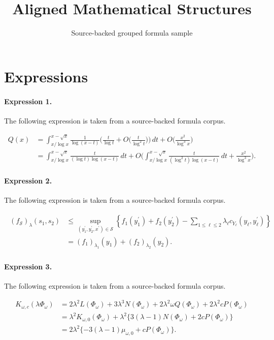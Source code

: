\documentclass[11pt]{article}
\title{Aligned Mathematical Structures}
\author{Source-backed grouped formula sample}
\date{}
\begin{document}
\maketitle
\section{Expressions}
\paragraph{Expression 1.} The following expression is taken from a source-backed formula corpus.

\begin{align*} Q(x) &= \int_{x/\log x}^{x-\sqrt x} \frac1{\log(x-t)}\bigg( \frac t{\log t} + O\bigg( \frac t{\log^2t} \bigg) \bigg) \,dt + O\bigg( \frac{x^2}{\log^3x} \bigg) \\ &= \int_{x/\log x}^{x-\sqrt x} \frac t{(\log t)\log(x-t)} \,dt + O\bigg( \int_{x/\log x}^{x-\sqrt x} \frac t{(\log^2t) \log(x-t)}\,dt + \frac{x^2}{\log^3x} \bigg). \end{align*}

\paragraph{Expression 2.} The following expression is taken from a source-backed formula corpus.

\begin{align*}\begin{aligned}(f_{\mathcal{S}})_\lambda(s_1, s_2) & \leq \sup_{ (y_1^\prime, y_2^\prime, x^\prime ) \in \mathcal{S} } \left\{ f_1(y_1^\prime) + f_2(y_2^\prime) - \sum_{1 \leq \ell \leq 2} \lambda_\ell c_{Y_\ell} \left( y_\ell, y_\ell^\prime \right) \right\} \\&= (f_1 )_{\lambda_1}(y_1) + (f_2 )_{\lambda_2}(y_2).\end{aligned}\end{align*}

\paragraph{Expression 3.} The following expression is taken from a source-backed formula corpus.

\begin{align*} K_{\omega,c}(\lambda \Phi_{\omega}) &=2\lambda^2L(\Phi_{\omega})+3\lambda^3N(\Phi_{\omega}) +2\lambda^2\omega Q(\Phi_{\omega}) +2\lambda^2cP(\Phi_{\omega})\\ &=\lambda^2K_{\omega,0}(\Phi_{\omega}) +\lambda^2\{3(\lambda -1)N(\Phi_{\omega})+2cP(\Phi_{\omega})\}\\ &=2\lambda^2\{-3(\lambda -1)\mu_{\omega,0}+cP(\Phi_{\omega})\}. \end{align*}
\end{document}
